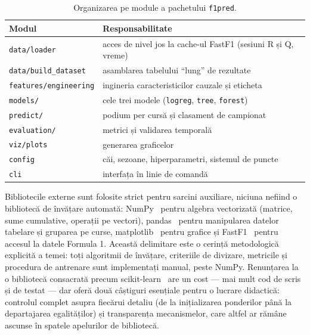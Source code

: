 \documentclass[12pt,a4paper]{report}
\begin{document}
\begin{table}[htbp]
  \centering
  \begin{tabular}{l l}
    \toprule
    \textbf{Modul} & \textbf{Responsabilitate} \\
    \midrule
    \texttt{data/loader}          & acces de nivel jos la cache-ul FastF1 (sesiuni R și Q, vreme) \\
    \texttt{data/build\_dataset}  & asamblarea tabelului ``lung'' de rezultate \\
    \texttt{features/engineering} & ingineria caracteristicilor cauzale și eticheta \\
    \texttt{models/}              & cele trei modele (\texttt{logreg}, \texttt{tree}, \texttt{forest}) \\
    \texttt{predict/}             & podium per cursă și clasament de campionat \\
    \texttt{evaluation/}          & metrici și validarea temporală \\
    \texttt{viz/plots}            & generarea graficelor \\
    \texttt{config}               & căi, sezoane, hiperparametri, sistemul de puncte \\
    \texttt{cli}                  & interfața în linie de comandă \\
    \bottomrule
  \end{tabular}
  \caption{Organizarea pe module a pachetului \texttt{f1pred}.}
  \label{tab:module}
\end{table}

Bibliotecile externe sunt folosite strict pentru sarcini auxiliare, niciuna nefiind o bibliotecă
de învățare automată: NumPy~\cite{harris2020numpy} pentru algebra vectorizată (matrice, sume
cumulative, operații pe vectori), pandas~\cite{mckinney2010pandas} pentru manipularea datelor
tabelare și gruparea pe curse, matplotlib~\cite{hunter2007matplotlib} pentru grafice și
FastF1~\cite{fastf1} pentru accesul la datele Formula 1. Această delimitare este o cerință
metodologică explicită a temei: toți algoritmii de învățare, criteriile de divizare, metricile și
procedura de antrenare sunt implementați manual, peste NumPy. Renunțarea la o bibliotecă consacrată
precum scikit-learn~\cite{pedregosa2011scikit} are un cost --- mai mult cod de scris și de
testat --- dar oferă două câștiguri esențiale pentru o lucrare didactică: controlul complet asupra
fiecărui detaliu (de la inițializarea ponderilor până la departajarea egalităților) și
transparența mecanismelor, care altfel ar rămâne ascunse în spatele apelurilor de bibliotecă.
\end{document}
